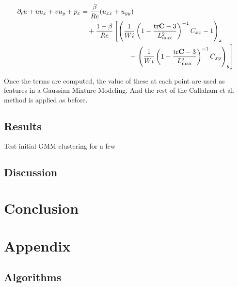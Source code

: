 \documentclass[12pt]{report} %
\begin{document}
\begin{equation}
  \begin{aligned}
  \partial_{t}u + u u_{x} + v u_{y} + p_{x} &= \frac{\beta}{Re} (u_{xx} + u_{yy}) \\
  &\quad + \frac{1 - \beta}{Re} \left[ \left( \frac{1}{Wi} \left(1 - \frac{\text{tr} \mathbf{C} - 3}{L_{\text{max}}^{2}} \right)^{-1} C_{xx} - 1 \right)_{x} \right. \\
  &\hspace{2.5cm} + \left. \left( \frac{1}{Wi} \left(1 - \frac{\text{tr} \mathbf{C} - 3}{L_{\text{max}}^{2}} \right)^{-1} C_{xy} \right)_{y} \right]
  \end{aligned}
\end{equation}

Once the terms are computed, the value of these at each point are used as features in a Gaussian Mixture Modeling. And the rest of the Callaham et al. method is applied as before.


\section{Results}

Test initial GMM clustering for a few

\section{Discussion}

\chapter{Conclusion}


\chapter{Appendix}

\section{Algorithms}
\end{document}
